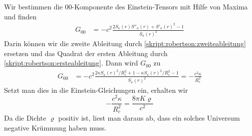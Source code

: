 Wir bestimmen die $00$-Komponente des Einstein-Tensors mit Hilfe
von Maxima und finden
\begin{align*}
G_{00}
&=
-c^2\frac{ 2S_\kappa(r)S''_\kappa(r) + S'_\kappa(r)^2-1 }{S_\kappa(r)^2}
\end{align*}
Darin können wir die zweite Ableitung durch
\eqref{skript:robertson:zweiteableitung}
ersetzen und das Quadrat der ersten Ableitung durch
\eqref{skript:robertson:ersteableitung}.
Dann wird $G_{00}$ zu
\begin{align*}
G_{00}
&=
-c^2\frac{2\kappa S_\kappa(r)^2/R_c^2 + 1-\kappa S_\kappa(r)^2/R_c^2-1 }{S_\kappa(r)^2}
=
-\frac{c^2\kappa}{R_c^2}
\end{align*}
Setzt man dies in die Einstein-Gleichungen ein, erhalten wir
\begin{equation}
-\frac{c^2\kappa}{R_c^2}=\frac{8\pi K\varrho}{c^2}
\end{equation}
Da die Dichte $\varrho$ positiv ist, liest man daraus ab, dass ein solches
Universum negative Krümmung haben muss.

